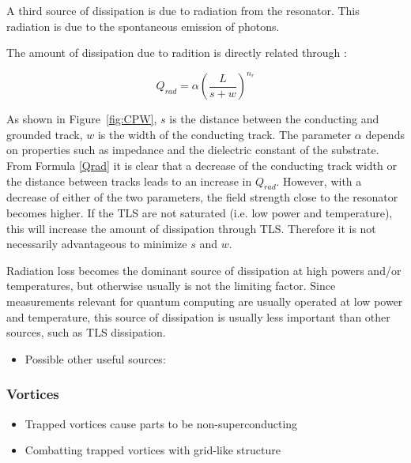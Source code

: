 \documentclass[12pt]{report}
\begin{document}
A third source of dissipation is due to radiation from the resonator. This radiation is due to the spontaneous emission of photons.

The amount of dissipation due to radition is directly related through \cite{sage2011study,Mazin}:

\begin{equation}
    Q_{rad} = \alpha \left( \frac{L}{s + w}\right)^{n_r}
    \label{Qrad}
\end{equation}

As shown in Figure~\ref{fig:CPW}, $s$ is the distance between the conducting and grounded track, $w$ is the width of the conducting track. The parameter $\alpha$ depends on properties such as impedance and the dielectric constant of the substrate. From Formula \ref{Qrad} it is clear that a decrease of the conducting track width or the distance between tracks leads to an increase in $Q_{rad}$. However, with a decrease of either of the two parameters, the field strength close to the resonator becomes higher. If the TLS are not saturated (i.e. low power and temperature), this will increase the amount of dissipation through TLS. Therefore it is not necessarily advantageous to minimize $s$ and $w$.

Radiation loss becomes the dominant source of dissipation at high powers and/or temperatures, but otherwise usually is not the limiting factor. Since measurements relevant for quantum computing are usually operated at low power and temperature, this source of dissipation is usually less important than other sources, such as TLS dissipation.

\begin{itemize}
    \item Possible other useful sources: \cite{denlinger1969radiation} \cite{khalil2011loss}
\end{itemize}



\subsubsection{Vortices}


\begin{itemize}
    \item Trapped vortices cause parts to be non-superconducting
    \item Combatting trapped vortices with grid-like structure
\end{itemize}
\end{document}
